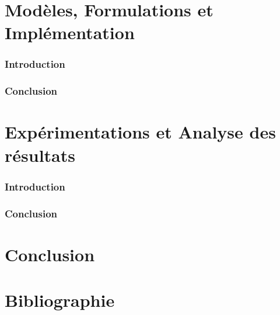\documentclass[10pt,a4paper]{article}
\begin{document}
	\newpage
	
	\part{Modèles, Formulations et Implémentation}
		\section*{Introduction}
		\section*{Conclusion}
		
	\newpage
	
	\part{Expérimentations et Analyse des résultats}
		\section*{Introduction}
		\section*{Conclusion}
		
	\newpage
		
	\part*{Conclusion}
	
	\part*{Bibliographie}
\end{document}
